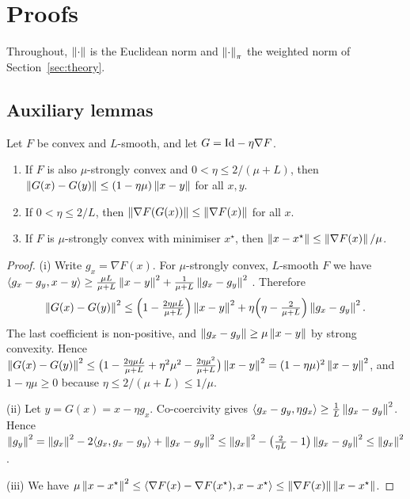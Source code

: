 \section{Proofs}
\label{app:proofs}

Throughout, $\left\lVert \cdot \right\rVert$ is the Euclidean norm and $\left\lVert \cdot \right\rVert_{\pi}$ the weighted norm of
Section~\ref{sec:theory}.

\subsection{Auxiliary lemmas}

\begin{lemma}\label{lem:gd}
Let $F$ be convex and $L$-smooth, and let $G=\mathrm{Id}-\eta\nabla F$.
\begin{enumerate}[label=(\roman*),leftmargin=1.6em,itemsep=1pt]
  \item If $F$ is also $\mu$-strongly convex and $0<\eta\le2/(\mu+L)$, then
    $\left\lVert G(x)-G(y) \right\rVert\le(1-\eta\mu)\left\lVert x-y \right\rVert$ for all $x,y$.
  \item If $0<\eta\le2/L$, then $\left\lVert \nabla F(G(x)) \right\rVert\le\left\lVert \nabla F(x) \right\rVert$ for all $x$.
  \item If $F$ is $\mu$-strongly convex with minimiser $x^\star$, then
    $\left\lVert x-x^\star \right\rVert\le\left\lVert \nabla F(x) \right\rVert/\mu$.
\end{enumerate}
\end{lemma}
\begin{proof}
(i) Write $g_x=\nabla F(x)$. For $\mu$-strongly convex, $L$-smooth $F$ we have
$\langle g_x-g_y,x-y\rangle\ge\frac{\mu L}{\mu+L}\left\lVert x-y \right\rVert^2+\frac{1}{\mu+L}\left\lVert g_x-g_y \right\rVert^2$
\citep[Thm.~2.1.12]{nesterov2018lectures}. Therefore
\[
  \left\lVert G(x)-G(y) \right\rVert^2\le\Bigl(1-\tfrac{2\eta\mu L}{\mu+L}\Bigr)\left\lVert x-y \right\rVert^2+\eta\Bigl(\eta-\tfrac{2}{\mu+L}\Bigr)\left\lVert g_x-g_y \right\rVert^2 .
\]
The last coefficient is non-positive, and $\left\lVert g_x-g_y \right\rVert\ge\mu\left\lVert x-y \right\rVert$ by strong
convexity. Hence
$\left\lVert G(x)-G(y) \right\rVert^2\le\bigl(1-\frac{2\eta\mu L}{\mu+L}+\eta^2\mu^2-\frac{2\eta\mu^2}{\mu+L}\bigr)\left\lVert x-y \right\rVert^2=(1-\eta\mu)^2\left\lVert x-y \right\rVert^2$,
and $1-\eta\mu\ge0$ because $\eta\le2/(\mu+L)\le1/\mu$.

(ii) Let $y=G(x)=x-\eta g_x$. Co-coercivity
\citep[Thm.~2.1.5]{nesterov2018lectures} gives
$\langle g_x-g_y,\eta g_x\rangle\ge\frac1L\left\lVert g_x-g_y \right\rVert^2$. Hence
$\left\lVert g_y \right\rVert^2=\left\lVert g_x \right\rVert^2-2\langle g_x,g_x-g_y\rangle+\left\lVert g_x-g_y \right\rVert^2\le\left\lVert g_x \right\rVert^2-\bigl(\frac{2}{\eta L}-1\bigr)\left\lVert g_x-g_y \right\rVert^2\le\left\lVert g_x \right\rVert^2$.

(iii) We have $\mu\left\lVert x-x^\star \right\rVert^2\le\langle\nabla F(x)-\nabla F(x^\star),x-x^\star\rangle\le\left\lVert \nabla F(x) \right\rVert\left\lVert x-x^\star \right\rVert$.
\end{proof}

